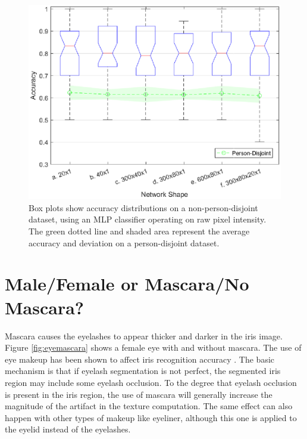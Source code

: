 \documentclass[10pt,twocolumn,letterpaper]{article}
\begin{document}
\begin{figure}[htb]
    \centering
    \includegraphics[width=1\linewidth]{img/pd_vs_npd.eps}
    \caption{Box plots show accuracy distributions on a non-person-disjoint dataset, using an MLP classifier operating on raw pixel intensity. The green dotted line and shaded area represent the average accuracy and deviation on a person-disjoint dataset.}
    \label{fig:persondisjoint}
\end{figure}

\section{Male/Female or Mascara/No Mascara?}
\label{sec:mascara}

Mascara causes the eyelashes to appear thicker and darker in the iris image.
Figure \ref{fig:eyemascara} shows a female eye with and without mascara.
The use of eye makeup has been shown to affect iris recognition accuracy \cite{Doyle2013}.
The basic mechanism is that if eyelash segmentation is not perfect, the segmented iris region may include some eyelash occlusion.
To the degree that eyelash occlusion is present in the iris region, the use of mascara will generally increase the magnitude of the artifact in the texture computation.
The same effect can also happen with other types of makeup like eyeliner, although this one is applied to the eyelid instead of the eyelashes.
\end{document}
